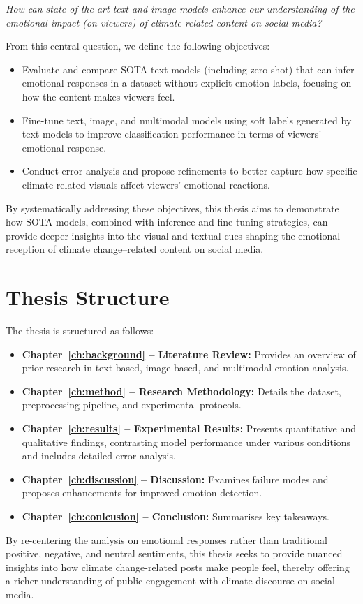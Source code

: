 \textit{How can state-of-the-art text and image models enhance our understanding of the \emph{emotional impact} (on viewers) of climate-related content on social media?}
\newline

From this central question, we define the following objectives:

\begin{itemize}
    \item Evaluate and compare SOTA text models (including zero-shot) that can infer emotional responses in a dataset without explicit emotion labels, focusing on how the content makes viewers feel.
    \item Fine-tune text, image, and multimodal models using soft labels generated by text models to improve classification performance in terms of viewers’ emotional response.
    \item Conduct error analysis and propose refinements to better capture how specific climate-related visuals affect viewers' emotional reactions.
\end{itemize}

By systematically addressing these objectives, this thesis aims to demonstrate how SOTA models, combined with inference and fine-tuning strategies, can provide deeper insights into the visual and textual cues shaping the emotional reception of climate change–related content on social media.

\section{Thesis Structure}

The thesis is structured as follows:

\begin{itemize}
    \item \textbf{Chapter~\ref{ch:background} – Literature Review:} Provides an overview of prior research in text-based, image-based, and multimodal emotion analysis.
    \item \textbf{Chapter~\ref{ch:method} – Research Methodology:} Details the dataset, preprocessing pipeline, and experimental protocols.
    \item \textbf{Chapter~\ref{ch:results} – Experimental Results:} Presents quantitative and qualitative findings, contrasting model performance under various conditions and includes detailed error analysis.
    \item \textbf{Chapter~\ref{ch:discussion} – Discussion:} Examines failure modes and proposes enhancements for improved emotion detection.
    \item \textbf{Chapter~\ref{ch:conlcusion} – Conclusion:} Summarises key takeaways.
\end{itemize}

By re-centering the analysis on emotional responses rather than traditional positive, negative, and neutral sentiments, this thesis seeks to provide nuanced insights into how climate change-related posts make people feel, thereby offering a richer understanding of public engagement with climate discourse on social media.